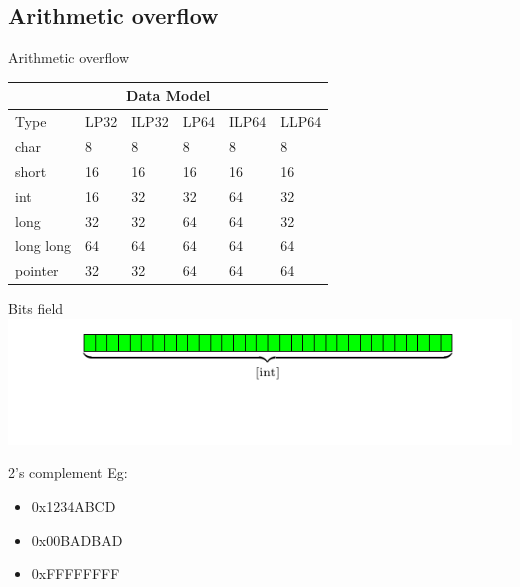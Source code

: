 \documentclass{beamer}
\begin{document}
\begin{CJK*}{UTF8}{bsmi}
    \subsection{Arithmetic overflow}
    \begin{frame}{Arithmetic overflow}
        \centering
        \begin{tabular}{ |p{2cm}||p{1cm}|p{1cm}|p{1cm}|p{1cm}|p{1cm}|  }
            \hline
            \multicolumn{6}{|c|}{Data Model}                \\
            \hline
            Type      & LP32 & ILP32 & LP64 & ILP64 & LLP64 \\
            \hline
            char      & 8    & 8     & 8    & 8     & 8     \\
            short     & 16   & 16    & 16   & 16    & 16    \\
            int       & 16   & 32    & 32   & 64    & 32    \\
            long      & 32   & 32    & 64   & 64    & 32    \\
            long long & 64   & 64    & 64   & 64    & 64    \\
            pointer   & 32   & 32    & 64   & 64    & 64    \\
            \hline
        \end{tabular}
    \end{frame}

    \begin{frame}{Bits field}
        \centering
        \includegraphics[width=\textwidth]{src/mem_layout/mem.pdf}
    \end{frame}

    \begin{frame}{2's complement}
        Eg:
        \begin{itemize}
            \item 0x1234ABCD
            \item 0x00BADBAD
            \item 0xFFFFFFFF
        \end{itemize}
    \end{frame}


\end{CJK*}
\end{document}
